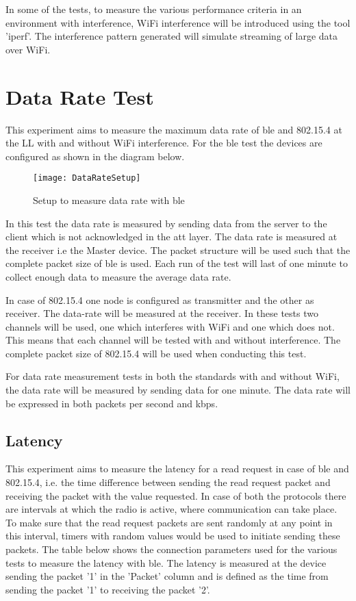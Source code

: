 In some of the tests, to measure the various performance criteria in an environment with interference, WiFi interference will be introduced using the tool 'iperf'. The interference pattern generated will simulate streaming of large data over WiFi.

\section{Data Rate Test}
This experiment aims to measure the maximum data rate of \gls{ble} and 802.15.4 at the LL with and without WiFi interference. For the \gls{ble} test the devices are configured as shown in the diagram below.

\begin{figure}[h]
    \centering
    \texttt{[image: DataRateSetup]}
	\caption{Setup to measure data rate with \gls{ble}}
\end{figure}

In this test the data rate is measured by sending data from the server to the client which is not acknowledged in the \gls{att} layer. The data rate is measured at the receiver i.e the Master device. The packet structure will be used such that the complete packet size of \gls{ble} is used. Each run of the test will last of one minute to collect enough data to measure the average data rate.

In case of 802.15.4 one node is configured as transmitter and the other as receiver. The data-rate will be measured at the receiver. In these tests two channels will be used, one which interferes with WiFi and one which does not. This means that each channel will be tested with and without interference. The complete packet size of 802.15.4 will be used when conducting this test.

For data rate measurement tests in both the standards with and without WiFi, the data rate will be measured by sending data for one minute. The data rate will be expressed in both packets per second and \gls{kbps}. 

\subsection{Latency}
This experiment aims to measure the latency for a read request in case of \gls{ble} and 802.15.4, i.e. the time difference between sending the read request packet and receiving the packet with the value requested. In case of both the protocols there are intervals at which the radio is active, where communication can take place. To make sure that the read request packets are sent randomly at any point in this interval, timers with random values would be used to initiate sending these packets. The table below shows the connection parameters used for the various tests to measure the latency with \gls{ble}. The latency is measured at the device sending the packet '1' in the 'Packet' column and is defined as the time from sending the packet '1' to receiving the packet '2'.

